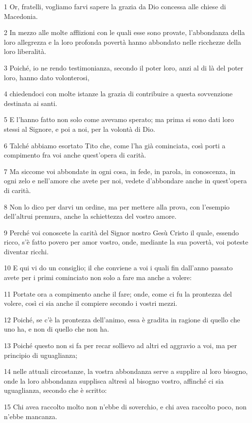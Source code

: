\par 1 Or, fratelli, vogliamo farvi sapere la grazia da Dio concessa alle chiese di Macedonia.
\par 2 In mezzo alle molte afflizioni con le quali esse sono provate, l'abbondanza della loro allegrezza e la loro profonda povertà hanno abbondato nelle ricchezze della loro liberalità.
\par 3 Poiché, io ne rendo testimonianza, secondo il poter loro, anzi al di là del poter loro, hanno dato volonterosi,
\par 4 chiedendoci con molte istanze la grazia di contribuire a questa sovvenzione destinata ai santi.
\par 5 E l'hanno fatto non solo come avevamo sperato; ma prima si sono dati loro stessi al Signore, e poi a noi, per la volontà di Dio.
\par 6 Talché abbiamo esortato Tito che, come l'ha già cominciata, così porti a compimento fra voi anche quest'opera di carità.
\par 7 Ma siccome voi abbondate in ogni cosa, in fede, in parola, in conoscenza, in ogni zelo e nell'amore che avete per noi, vedete d'abbondare anche in quest'opera di carità.
\par 8 Non lo dico per darvi un ordine, ma per mettere alla prova, con l'esempio dell'altrui premura, anche la schiettezza del vostro amore.
\par 9 Perché voi conoscete la carità del Signor nostro Gesù Cristo il quale, essendo ricco, s'è fatto povero per amor vostro, onde, mediante la sua povertà, voi poteste diventar ricchi.
\par 10 E qui vi do un consiglio; il che conviene a voi i quali fin dall'anno passato avete per i primi cominciato non solo a fare ma anche a volere:
\par 11 Portate ora a compimento anche il fare; onde, come ci fu la prontezza del volere, così ci sia anche il compiere secondo i vostri mezzi.
\par 12 Poiché, se c'è la prontezza dell'animo, essa è gradita in ragione di quello che uno ha, e non di quello che non ha.
\par 13 Poiché questo non si fa per recar sollievo ad altri ed aggravio a voi, ma per principio di uguaglianza;
\par 14 nelle attuali circostanze, la vostra abbondanza serve a supplire al loro bisogno, onde la loro abbondanza supplisca altresì al bisogno vostro, affinché ci sia uguaglianza, secondo che è scritto:
\par 15 Chi avea raccolto molto non n'ebbe di soverchio, e chi avea raccolto poco, non n'ebbe mancanza.

